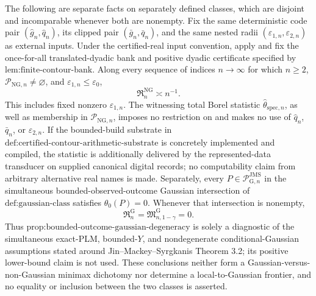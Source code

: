 The following are separate facts on separately defined classes, which are disjoint and incomparable whenever both are nonempty. Fix the same deterministic code pair \((\widehat g_n,\widehat q_n)\), its clipped pair \((\bar g_n,\bar q_n)\), and the same nested radii \((\varepsilon_{1,n},\varepsilon_{2,n})\) as external inputs. Under the certified-real input convention, apply and fix the once-for-all translated-dyadic bank and positive dyadic certificate specified by \(\text{lem:finite-contour-bank}\). Along every sequence of indices \(n\to\infty\) for which \(n\ge2\), \(\mathcal P_{\mathrm{NG},n}\neq\varnothing\), and \(\varepsilon_{1,n}\le\varepsilon_0\),
\[
 \mathfrak R_n^{\mathrm{NG}}\asymp n^{-1}.
\]
This includes fixed nonzero \(\varepsilon_{1,n}\). The witnessing total Borel statistic \(\widehat\theta_{\mathrm{spec},n}\), as well as membership in \(\mathcal P_{\mathrm{NG},n}\), imposes no restriction on and makes no use of \(\widehat q_n\), \(\bar q_n\), or \(\varepsilon_{2,n}\). If the bounded-build substrate in \(\text{def:certified-contour-arithmetic-substrate}\) is concretely implemented and compiled, the statistic is additionally delivered by the represented-data transducer on supplied canonical digital records; no computability claim from arbitrary alternative real names is made. Separately, every \(P\in\mathcal P_{\mathrm G,n}^{\mathrm{JMS}}\) in the simultaneous bounded-observed-outcome Gaussian intersection of \(\text{def:gaussian-class}\) satisfies \(\theta_0(P)=0\). Whenever that intersection is nonempty,
\[
 \mathfrak R_n^{\mathrm G}
 =\mathfrak M_{n,1-\gamma}^{\mathrm G}
 =0.
\]
Thus \(\text{prop:bounded-outcome-gaussian-degeneracy}\) is solely a diagnostic of the simultaneous exact-PLM, bounded-\(Y\), and nondegenerate conditional-Gaussian assumptions stated around Jin--Mackey--Syrgkanis Theorem 3.2; its positive lower-bound claim is not used. These conclusions neither form a Gaussian-versus-non-Gaussian minimax dichotomy nor determine a local-to-Gaussian frontier, and no equality or inclusion between the two classes is asserted.